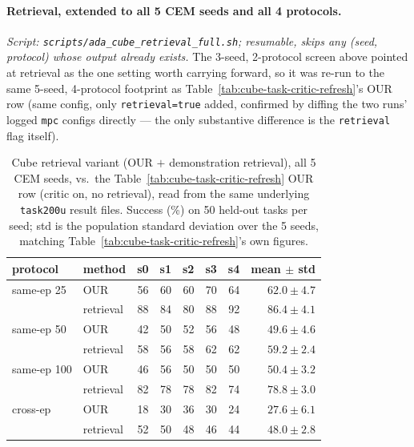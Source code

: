 \documentclass[11pt]{article}
\begin{document}
\paragraph{Retrieval, extended to all 5 CEM seeds and all 4 protocols.}
\emph{Script: \texttt{scripts/ada\_cube\_retrieval\_full.sh}; resumable, skips any
(seed, protocol) whose output already exists.} The 3-seed, 2-protocol screen above pointed at
retrieval as the one setting worth carrying forward, so it was re-run to the same 5-seed,
4-protocol footprint as Table~\ref{tab:cube-task-critic-refresh}'s OUR row (same config, only
\texttt{retrieval=true} added, confirmed by diffing the two runs' logged \texttt{mpc} configs
directly --- the only substantive difference is the \texttt{retrieval} flag itself).

\begin{table}[t]
\centering
\small
\caption{Cube retrieval variant (OUR $+$ demonstration retrieval), all 5 CEM seeds, vs.\ the
Table~\ref{tab:cube-task-critic-refresh} OUR row (critic on, no retrieval), read from the same
underlying \texttt{task200u} result files. Success (\%) on 50 held-out tasks per seed; std is
the population standard deviation over the 5 seeds, matching
Table~\ref{tab:cube-task-critic-refresh}'s own figures.}
\label{tab:cube-retrieval-full}
\begin{tabular}{llrrrrrr}
\toprule
protocol & method & s0 & s1 & s2 & s3 & s4 & mean $\pm$ std \\
\midrule
same-ep 25  & OUR       & 56 & 60 & 60 & 70 & 64 & $62.0 \pm 4.7$ \\
            & retrieval & 88 & 84 & 80 & 88 & 92 & $86.4 \pm 4.1$ \\
\midrule
same-ep 50  & OUR       & 42 & 50 & 52 & 56 & 48 & $49.6 \pm 4.6$ \\
            & retrieval & 58 & 56 & 58 & 62 & 62 & $59.2 \pm 2.4$ \\
\midrule
same-ep 100 & OUR       & 46 & 56 & 50 & 50 & 50 & $50.4 \pm 3.2$ \\
            & retrieval & 82 & 78 & 78 & 82 & 74 & $78.8 \pm 3.0$ \\
\midrule
cross-ep    & OUR       & 18 & 30 & 36 & 30 & 24 & $27.6 \pm 6.1$ \\
            & retrieval & 52 & 50 & 48 & 46 & 44 & $48.0 \pm 2.8$ \\
\bottomrule
\end{tabular}
\end{table}
\end{document}
